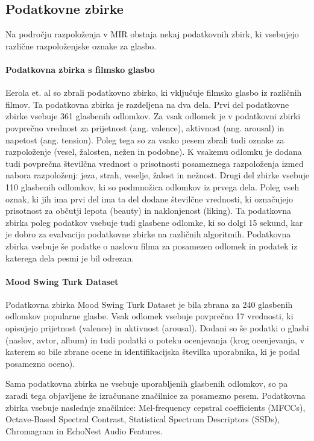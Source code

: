 \documentclass[a4paper, 12pt]{book}
\begin{document}
{\subsection{Podatkovne zbirke}

Na področju razpoloženja v MIR obstaja nekaj podatkovnih zbirk, ki vsebujejo različne razpoloženjske oznake za glasbo.

\paragraph{Podatkovna zbirka s filmsko glasbo}

Eerola et. al \cite{Eerola2010} so zbrali podatkovno zbirko, ki vključuje filmsko glasbo iz različnih filmov. Ta podatkovna zbirka je razdeljena na dva dela. Prvi del podatkovne zbirke vsebuje 361 glasbenih odlomkov. Za vsak odlomek je v podatkovni zbirki povprečno vrednost za prijetnost (ang. valence), aktivnost (ang. arousal) in  napetost (ang. tension). Poleg tega so za vsako pesem zbrali tudi oznake za razpoloženje (vesel, žalosten, nežen in podobne). K vsakemu odlomku je dodana tudi povprečna številčna vrednost o prisotnosti posameznega razpoloženja izmed nabora razpoloženj: jeza, strah, veselje, žalost in nežnost. Drugi del zbirke vsebuje 110 glasbenih odlomkov, ki so podmnožica odlomkov iz prvega dela. Poleg vseh oznak, ki jih ima prvi del ima ta del dodane številčne vrednosti, ki označujejo prisotnost za občutji lepota (beauty) in naklonjenost (liking). Ta podatkovna zbirka poleg podatkov vsebuje tudi glasbene odlomke, ki so dolgi 15 sekund, kar je dobro za evalvacijo podatkovne zbirke na različnih algoritmih. Podatkovna zbirka vsebuje še podatke o naslovu filma za posamezen odlomek in podatek iz katerega dela pesmi je bil odrezan. 

\paragraph{Mood Swing Turk Dataset}

Podatkovna zbirka Mood Swing Turk Dataset \cite{schmidt2011modeling} je bila zbrana za 240 glasbenih odlomkov popularne glasbe. Vsak odlomek vsebuje povprečno 17 vrednosti, ki opisujejo prijetnost (valence) in aktivnost (arousal). Dodani so še podatki o glasbi (naslov, avtor, album) in tudi podatki o poteku ocenjevanja (krog ocenjevanja, v katerem so bile zbrane ocene in identifikacijska številka uporabnika, ki je podal posamezno oceno). 

Sama podatkovna zbirka ne vsebuje uporabljenih glasbenih odlomkov, so pa zaradi tega objavljene že izračunane značilnice za posamezno pesem. Podatkovna zbirka vsebuje naslednje značilnice: Mel-frequency cepstral coefficients (MFCCs), Octave-Based Spectral Contrast, Statistical Spectrum Descriptors (SSDs), Chromagram in EchoNest Audio Features.

}
\end{document}
